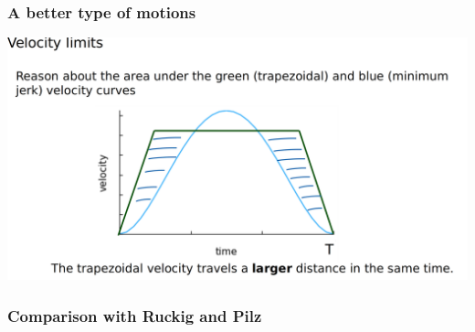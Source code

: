 \begin{frame}
	\frametitle{A better type of motions}
	\includegraphics[width=\textwidth]{./images/temporal_slide_trapezoidal_and_corners.png}
\end{frame}

\begin{frame}
	\frametitle{Comparison with Ruckig and Pilz}
\end{frame}


